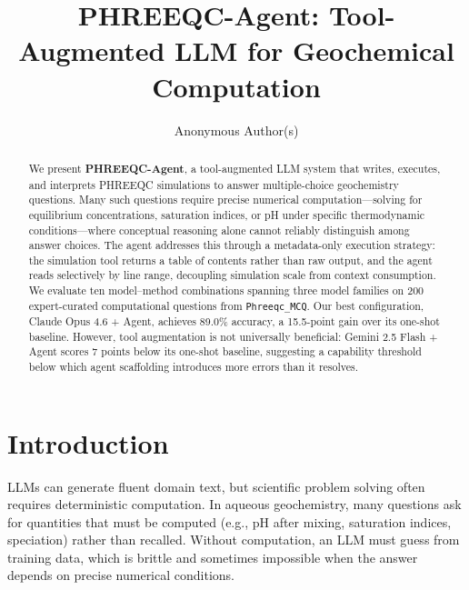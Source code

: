 \documentclass[sigconf,anonymous]{acmart}
\begin{document}
\title{PHREEQC-Agent: Tool-Augmented LLM for Geochemical Computation}

\author{Anonymous Author(s)}

\begin{abstract}
We present \textbf{PHREEQC-Agent}, a tool-augmented LLM system that writes, executes, and interprets PHREEQC simulations to answer multiple-choice geochemistry questions. Many such questions require precise numerical computation---solving for equilibrium concentrations, saturation indices, or pH under specific thermodynamic conditions---where conceptual reasoning alone cannot reliably distinguish among answer choices. The agent addresses this through a metadata-only execution strategy: the simulation tool returns a table of contents rather than raw output, and the agent reads selectively by line range, decoupling simulation scale from context consumption. We evaluate ten model--method combinations spanning three model families on 200 expert-curated computational questions from \texttt{Phreeqc\_MCQ}. Our best configuration, Claude Opus 4.6 + Agent, achieves 89.0\% accuracy, a 15.5-point gain over its one-shot baseline. However, tool augmentation is not universally beneficial: Gemini 2.5 Flash + Agent scores 7 points below its one-shot baseline, suggesting a capability threshold below which agent scaffolding introduces more errors than it resolves.
\end{abstract}


\maketitle

\section{Introduction}
LLMs can generate fluent domain text, but scientific problem solving often requires deterministic computation. In aqueous geochemistry, many questions ask for quantities that must be computed (e.g., pH after mixing, saturation indices, speciation) rather than recalled. Without computation, an LLM must guess from training data, which is brittle and sometimes impossible when the answer depends on precise numerical conditions.
\end{document}
